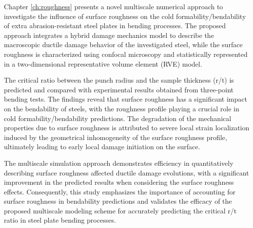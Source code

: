 
Chapter \ref{ch:roughness} presents a novel multiscale numerical approach to investigate the influence of surface roughness on the cold formability/bendability of extra abrasion-resistant steel plates in bending processes. The proposed approach integrates a hybrid damage mechanics model to describe the macroscopic ductile damage behavior of the investigated steel, while the surface roughness is characterized using confocal microscopy and statistically represented in a two-dimensional representative volume element (RVE) model.

The critical ratio between the punch radius and the sample thickness (r/t) is predicted and compared with experimental results obtained from three-point bending tests. The findings reveal that surface roughness has a significant impact on the bendability of steels, with the roughness profile playing a crucial role in cold formability/bendability predictions. The degradation of the mechanical properties due to surface roughness is attributed to severe local strain localization induced by the geometrical inhomogeneity of the surface roughness profile, ultimately leading to early local damage initiation on the surface.

The multiscale simulation approach demonstrates efficiency in quantitatively describing surface roughness affected ductile damage evolutions, with a significant improvement in the predicted results when considering the surface roughness effects. Consequently, this study emphasizes the importance of accounting for surface roughness in bendability predictions and validates the efficacy of the proposed multiscale modeling scheme for accurately predicting the critical r/t ratio in steel plate bending processes.